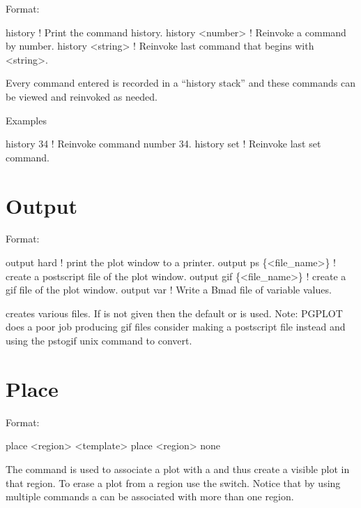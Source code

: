 Format:
\begin{example}
  history           ! Print the command history.
  history <number>  ! Reinvoke a command by number.
  history <string>  ! Reinvoke last command that begins with <string>.
\end{example}

\vskip 0.2in
Every \tao command entered is recorded in a ``history stack'' and
these commands can be viewed and reinvoked as needed. 

Examples
\begin{example}
  history 34   ! Reinvoke command number 34.
  history set  ! Reinvoke last set command.  
\end{example}

\section{Output}
\label{s:output}

Format:
\begin{example}
  output hard              ! print the plot window to a printer.
  output ps \{<file_name>\}  ! create a postscript file of the plot window.
  output gif \{<file_name>\} ! create a gif file of the plot window.
  output var               ! Write a Bmad file of variable values.
\end{example}

\vskip 0.2in  creates various files. If  is
not given then the default  or 
is used. Note: PGPLOT does a poor job producing gif files consider
making a postscript file instead and using the pstogif unix command to
convert.

\section{Place}
\label{s:place}

Format:
\begin{example}
  place <region> <template>
  place <region> none
\end{example}

\vskip 0.2in 
The  command is used to associate a  plot
with a  and thus create a visible plot in that region. To
erase a plot from a region use the  switch. Notice that by
using multiple  commands a  can be associated
with more than one region.

